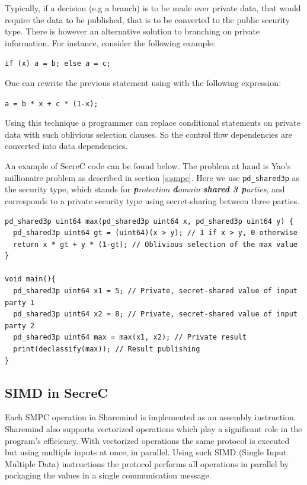 Typically, if a decision (e.g a branch) is to be made over private data, that would require the data to be published, that is to be converted to the public security type.
There is however an alternative solution to branching on private information.
For instance, consider the following example:

\texttt{if (x) a = b; else a = c; }

One can rewrite the previous statement using with the following expression:

\texttt{a = b * x + c * (1-x); }

Using this technique a programmer can replace conditional statements on private data with such oblivious selection clauses.
So the control flow dependencies are converted into data dependencies.

An example of SecreC code can be found below.
The problem at hand is Yao's millionaire problem \cite{yao1982protocols} as described in section \ref{s:smpc}.
Here we use \texttt{pd\_shared3p} as the security type, which stands for \textit{\textbf{p}rotection \textbf{d}omain \textbf{shared 3 p}arties}, and corresponds to a private security type using secret\hyp sharing between three parties.

{
\begin{verbatim}
pd_shared3p uint64 max(pd_shared3p uint64 x, pd_shared3p uint64 y) {
  pd_shared3p uint64 gt = (uint64)(x > y); // 1 if x > y, 0 otherwise
  return x * gt + y * (1-gt); // Oblivious selection of the max value
}

void main(){
  pd_shared3p uint64 x1 = 5; // Private, secret-shared value of input party 1
  pd_shared3p uint64 x2 = 8; // Private, secret-shared value of input party 2
  pd_shared3p uint64 max = max(x1, x2); // Private result
  print(declassify(max)); // Result publishing
}
\end{verbatim}
\label{l:millionaires}
}


\subsection{SIMD in SecreC}\label{ss:simd-secrec}

Each SMPC operation in Sharemind is implemented as an assembly instruction.
Sharemind also supports vectorized operations which play a significant role in the program's efficiency.
With vectorized operations the same protocol is executed but using multiple inputs at once, in parallel.
Using such SIMD (Single Input Multiple Data) instructions the protocol performs all operations in parallel by packaging the values in a single communication message.

